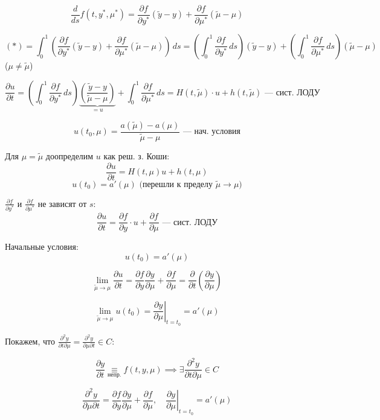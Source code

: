 \documentclass[a4paper,12pt]{article}
\begin{document}
\[
    \frac{d}{ds} f(t, y^*, \mu^*) = \frac{\partial f}{\partial y^*} (\tilde{y} - y) + \frac{\partial f}{\partial \mu^*} (\tilde{\mu} - \mu)
\]

\[
    (*) = \int_0^1 \left( \frac{\partial f}{\partial y^*} (\tilde{y} - y) + \frac{\partial f}{\partial \mu^*} (\tilde{\mu} - \mu) \right) \, ds 
    = \left( \int_0^1 \frac{\partial f}{\partial y^*} \, ds \right) (\tilde{y} - y) + \left( \int_0^1 \frac{\partial f}{\partial \mu^*} \, ds \right) (\tilde{\mu} - \mu)
\]
($\mu \neq \tilde{\mu}$)

\[
    \frac{\partial u}{\partial t} = \left( \int_0^1 \frac{\partial f}{\partial y^*} \, ds \right) \underbrace{\left( \frac{\tilde{y} - y}{\tilde{\mu} - \mu} \right)}_{=u} + \int_0^1 \frac{\partial f}{\partial \mu^*} \, ds = H(t, \tilde{\mu}) \cdot u + h(t, \tilde{\mu}) \text{ — сист. ЛОДУ}
\]

\[
    u(t_0, \mu) = \frac{a(\tilde{\mu}) - a(\mu)}{\tilde{\mu} - \mu} \text{ — нач. условия}
\]

Для $\mu = \tilde{\mu}$ доопределим $u$ как реш. з. Коши:
\[
    \frac{\partial u}{\partial t} = H(t, \mu) u + h(t, \mu)
\]
\[
    u(t_0) = a'(\mu) \text{ (перешли к пределу } \tilde{\mu} \to \mu)
\]

$\frac{\partial f}{\partial y^*}$ и $\frac{\partial f}{\partial \mu^*}$ не зависят от $s$:
\[
    \frac{\partial u}{\partial t} = \frac{\partial f}{\partial y} \cdot u + \frac{\partial f}{\partial \mu} \text{ — сист. ЛОДУ}
\]

Начальные условия:
\[
    u(t_0) = a'(\mu)
\]

\[
    \lim_{\tilde{\mu} \to \mu} \frac{\partial u}{\partial t} = \frac{\partial f}{\partial y} \frac{\partial y}{\partial \mu} + \frac{\partial f}{\partial \mu} = \frac{\partial}{\partial t}\left(\frac{\partial y}{\partial \mu}\right)
\]

\[
    \lim_{\tilde{\mu} \to \mu} u(t_0) = \left. \frac{\partial y}{\partial \mu} \right|_{t=t_0} = a'(\mu)
\]

Покажем, что $\frac{\partial^2 y}{\partial t \partial \mu} = \frac{\partial^2 y}{\partial \mu \partial t} \in C$:

\[
    \frac{\partial y}{\partial t} \underset{\text{непр.}}{\equiv} f(t, y, \mu) \implies \exists \frac{\partial^2 y}{\partial t \partial \mu} \in C
\]

\[
    \frac{\partial^2 y}{\partial \mu \partial t} = \frac{\partial f}{\partial y} \frac{\partial y}{\partial \mu} + \frac{\partial f}{\partial \mu}, \quad \left. \frac{\partial y}{\partial \mu} \right|_{t=t_0} = a'(\mu)
\]
\end{document}

